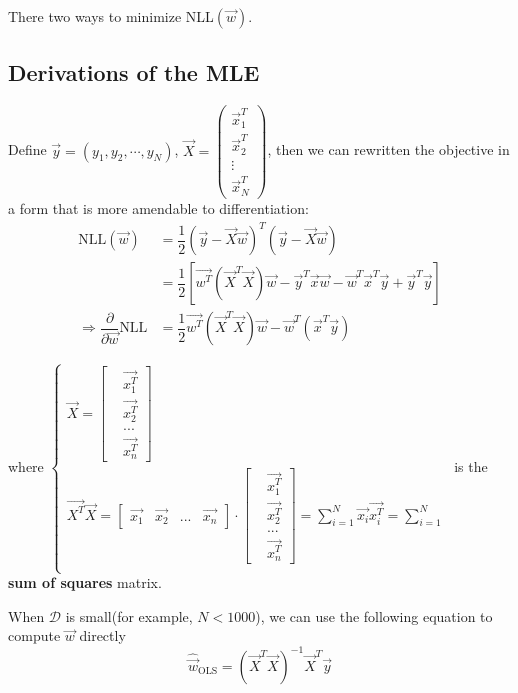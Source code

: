\documentclass[]{article}
\begin{document}
There two ways to minimize NLL$(\vec{w})$.


\subsection{Derivations of the MLE}
Define $\vec{y}=(y_1,y_2,\cdots,y_N)$, $\vec{X}=\left(\begin{array}{c}\vec{x}_1^T \\ \vec{x}_2^T \\ \vdots \\ \vec{x}_N^T\end{array}\right)$, then we can rewritten the objective in a form that is more amendable to differentiation:
\begin{align}
\text{NLL}(\vec{w}) &= \dfrac{1}{2}(\vec{y}-\vec{X}\vec{w})^T(\vec{y}-\vec{X}\vec{w})\\
&= \dfrac{1}{2} [\vec{w^T} (\vec{X}^T\vec{X})\vec{w} - \vec{y}^T\vec{x}\vec{w}- \vec{w}^T\vec{x}^T\vec{y}  +\vec{y}^T\vec{y}]			\\
\Rightarrow
\dfrac{\partial}{\partial \vec{w}}\text{NLL} &= \dfrac{1}{2} \vec{w^T} (\vec{X}^T\vec{X})\vec{w} -\vec{w}^T(\vec{x}^T\vec{y}) 
\end{align}

where
$\begin{cases}
\vec{X} = \begin{bmatrix}
&\vec{x_1^T} \\
&\vec{x_2^T} \\
& ... \\
&\vec{x_n^T}
\end{bmatrix}\\	
\vec{X^T}\vec{X} =
\begin{bmatrix}
\vec{x_1} & \vec{x_2} & ...&\vec{x_n}
\end{bmatrix} 
\cdot
\begin{bmatrix}
&\vec{x_1^T} \\
&\vec{x_2^T} \\
& ... \\
&\vec{x_n^T}
\end{bmatrix}  = \sum\limits_{i=1}^{N}\vec{x_i}\vec{x_i^T} = \sum\limits_{i=1}^{N} \\
\end{cases}$
is the \textbf{sum of squares } matrix.

When $\mathcal{D}$ is small(for example, $N < 1000$), we can use the following equation to compute $\vec{w}$ directly
\begin{equation}
\hat{\vec{w}}_{\mathrm{OLS}}=(\vec{X}^T\vec{X})^{-1}\vec{X}^T\vec{y}
\end{equation}
\end{document}
